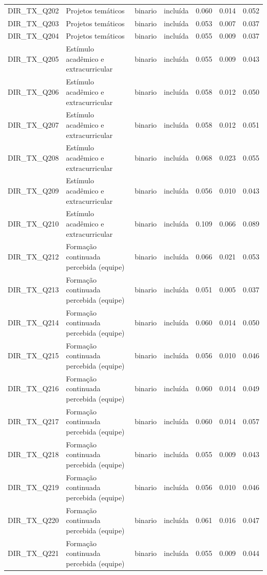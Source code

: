 \begin{tabular}{llllrrr}
DIR\_TX\_Q202 & Projetos temáticos & binario & incluída & 0.060 & 0.014 & 0.052 \\
DIR\_TX\_Q203 & Projetos temáticos & binario & incluída & 0.053 & 0.007 & 0.037 \\
DIR\_TX\_Q204 & Projetos temáticos & binario & incluída & 0.055 & 0.009 & 0.037 \\
DIR\_TX\_Q205 & Estímulo acadêmico e extracurricular & binario & incluída & 0.055 & 0.009 & 0.043 \\
DIR\_TX\_Q206 & Estímulo acadêmico e extracurricular & binario & incluída & 0.058 & 0.012 & 0.050 \\
DIR\_TX\_Q207 & Estímulo acadêmico e extracurricular & binario & incluída & 0.058 & 0.012 & 0.051 \\
DIR\_TX\_Q208 & Estímulo acadêmico e extracurricular & binario & incluída & 0.068 & 0.023 & 0.055 \\
DIR\_TX\_Q209 & Estímulo acadêmico e extracurricular & binario & incluída & 0.056 & 0.010 & 0.043 \\
DIR\_TX\_Q210 & Estímulo acadêmico e extracurricular & binario & incluída & 0.109 & 0.066 & 0.089 \\
DIR\_TX\_Q212 & Formação continuada percebida (equipe) & binario & incluída & 0.066 & 0.021 & 0.053 \\
DIR\_TX\_Q213 & Formação continuada percebida (equipe) & binario & incluída & 0.051 & 0.005 & 0.037 \\
DIR\_TX\_Q214 & Formação continuada percebida (equipe) & binario & incluída & 0.060 & 0.014 & 0.050 \\
DIR\_TX\_Q215 & Formação continuada percebida (equipe) & binario & incluída & 0.056 & 0.010 & 0.046 \\
DIR\_TX\_Q216 & Formação continuada percebida (equipe) & binario & incluída & 0.060 & 0.014 & 0.049 \\
DIR\_TX\_Q217 & Formação continuada percebida (equipe) & binario & incluída & 0.060 & 0.014 & 0.057 \\
DIR\_TX\_Q218 & Formação continuada percebida (equipe) & binario & incluída & 0.055 & 0.009 & 0.043 \\
DIR\_TX\_Q219 & Formação continuada percebida (equipe) & binario & incluída & 0.056 & 0.010 & 0.046 \\
DIR\_TX\_Q220 & Formação continuada percebida (equipe) & binario & incluída & 0.061 & 0.016 & 0.047 \\
DIR\_TX\_Q221 & Formação continuada percebida (equipe) & binario & incluída & 0.055 & 0.009 & 0.044 \\

\end{tabular}
